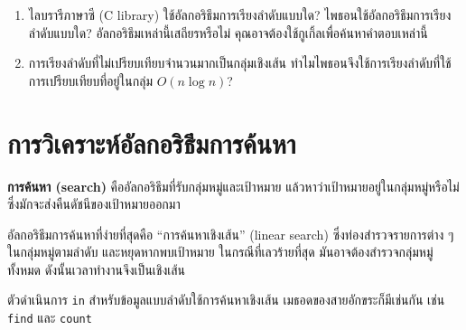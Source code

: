 \begin{exercise}
\begin{enumerate}
\item ไลบรารีภาษาซี (C library) ใช้อัลกอริธึมการเรียงลำดับแบบใด? 
ไพธอนใช้อัลกอริธึมการเรียงลำดับแบบใด? 
อัลกอริธึมเหล่านี้เสถียรหรือไม่ คุณอาจต้องใช้กูเกิ้ลเพื่อค้นหาคำตอบเหล่านี้

\item การเรียงลำดับที่ไม่เปรียบเทียบจำนวนมากเป็นกลุ่มเชิงเส้น ทำไมไพธอนจึงใช้การเรียงลำดับที่ใช้การเปรียบเทียบที่อยู่ในกลุ่ม {\scriptsize$O(n \log n)$}?

\end{enumerate}

\end{exercise}


\section{การวิเคราะห์อัลกอริธึมการค้นหา} %

\textbf{การค้นหา (search)} คืออัลกอริธึมที่รับกลุ่มหมู่และเป้าหมาย
แล้วหาว่าเป้าหมายอยู่ในกลุ่มหมู่หรือไม่ ซึ่งมักจะส่งคืนดัชนีของเป้าหมายออกมา

อัลกอริธึมการค้นหาที่ง่ายที่สุดคือ ``การค้นหาเชิงเส้น'' (linear search) ซึ่งท่องสำรวจรายการต่าง ๆ ในกลุ่มหมู่ตามลำดับ และหยุดหากพบเป้าหมาย 
ในกรณีที่เลวร้ายที่สุด 
มันอาจต้องสำรวจกลุ่มหมู่ทั้งหมด ดังนั้นเวลาทำงานจึงเป็นเชิงเส้น

ตัวดำเนินการ {\tt in} สำหรับข้อมูลแบบลำดับใช้การค้นหาเชิงเส้น เมธอดของสายอักขระก็มีเช่นกัน เช่น {\tt find} และ {\tt count}

